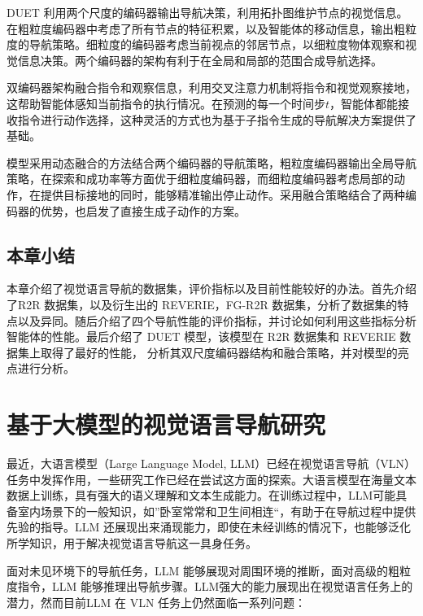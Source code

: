 \documentclass[bachelor]{thesis-uestc}
\begin{document}
DUET 利用两个尺度的编码器输出导航决策，利用拓扑图维护节点的视觉信息。在粗粒度编码器中考虑了所有节点的特征积累，以及智能体的移动信息，输出粗粒度的导航策略。细粒度的编码器考虑当前视点的邻居节点，以细粒度物体观察和视觉信息决策。两个编码器的架构有利于在全局和局部的范围合成导航选择。

双编码器架构融合指令和观察信息，利用交叉注意力机制将指令和视觉观察接地，这帮助智能体感知当前指令的执行情况。在预测的每一个时间步$t$，智能体都能接收指令进行动作选择，这种灵活的方式也为基于子指令生成的导航解决方案提供了基础。

模型采用动态融合的方法结合两个编码器的导航策略，粗粒度编码器输出全局导航策略，在探索和成功率等方面优于细粒度编码器，而细粒度编码器考虑局部的动作，在提供目标接地的同时，能够精准输出停止动作。采用融合策略结合了两种编码器的优势，也启发了直接生成子动作的方案。

\section{本章小结}

本章介绍了视觉语言导航的数据集，评价指标以及目前性能较好的办法。首先介绍了R2R 数据集，以及衍生出的 REVERIE，FG-R2R 数据集，分析了数据集的特点以及异同。随后介绍了四个导航性能的评价指标，并讨论如何利用这些指标分析智能体的性能。最后介绍了 DUET 模型，该模型在 R2R 数据集和 REVERIE 数据集上取得了最好的性能， 分析其双尺度编码器结构和融合策略，并对模型的亮点进行分析。


\chapter{基于大模型的视觉语言导航研究}

最近，大语言模型（Large Language Model, LLM）已经在视觉语言导航（VLN）任务中发挥作用，一些研究工作已经在尝试这方面的探索。大语言模型在海量文本数据上训练，具有强大的语义理解和文本生成能力。在训练过程中，LLM可能具备室内场景下的一般知识，如”卧室常常和卫生间相连“，有助于在导航过程中提供先验的指导。LLM 还展现出来涌现能力，即使在未经训练的情况下，也能够泛化所学知识，用于解决视觉语言导航这一具身任务。

面对未见环境下的导航任务，LLM 能够展现对周围环境的推断，面对高级的粗粒度指令，LLM 能够推理出导航步骤。LLM强大的能力展现出在视觉语言任务上的潜力，然而目前LLM 在 VLN 任务上仍然面临一系列问题：
\end{document}
